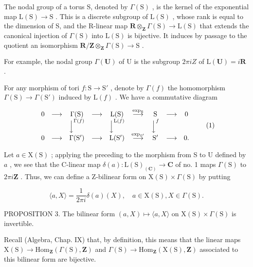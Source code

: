 The nodal group of a torus S, denoted by \(\Gamma(\mathrm{S})\) , is the kernel of the exponential map \(\mathrm{L}(\mathrm{S}) \to \mathrm{S}\) . This is a discrete subgroup of \(\mathrm{L}(\mathrm{S})\) , whose rank is equal to the dimension of S, and the R-linear map \(\mathbf{R} \otimes_{\mathbf{Z}} \Gamma(\mathrm{S}) \to \mathrm{L}(\mathrm{S})\) that extends the canonical injection of \(\Gamma(\mathrm{S})\) into \(\mathrm{L}(\mathrm{S})\) is bijective. It induces by passage to the quotient an isomorphism \(\mathbf{R}/\mathbf{Z} \otimes_{\mathbf{Z}} \Gamma(\mathrm{S}) \to \mathrm{S}\) .

For example, the nodal group \(\Gamma(\mathbf{U})\) of U is the subgroup \(2\pi iZ\) of \(\mathrm{L}(\mathbf{U}) = i\mathbf{R}\) .

For any morphism of tori \(f: \mathrm{S} \to \mathrm{S}'\) , denote by \(\Gamma(f)\) the homomorphism \(\Gamma(\mathrm{S}) \to \Gamma(\mathrm{S}')\) induced by \(\mathrm{L}(f)\) . We have a commutative diagram

\[
\begin{array}{c c c c c c c c c} 0 & \longrightarrow & \Gamma (\mathrm{S}) & \longrightarrow & \mathrm{L} (\mathrm{S}) & \stackrel {{\exp_ {\mathrm{S}}}} {{\longrightarrow}} & \mathrm{S} & \longrightarrow & 0 \\ & & \Big \downarrow^ {\Gamma (f)} & & \Big \downarrow^ {\mathrm{L} (f)} & & \Big \downarrow^ {f} \\ 0 & \longrightarrow & \Gamma (\mathrm{S} ^ {\prime}) & \longrightarrow & \mathrm{L} (\mathrm{S} ^ {\prime}) & \stackrel {{\exp_ {\mathrm{S} ^ {\prime}}}} {{\longrightarrow}} & \mathrm{S} ^ {\prime} & \longrightarrow & 0. \end{array}\tag{1}
\]

Let \(a \in \mathrm{X}(\mathrm{S})\) ; applying the preceding to the morphism from S to U defined by \(a\) , we see that the C-linear map \(\delta(a) : \mathrm{L}(\mathrm{S})_{(\mathbf{C})} \to \mathbf{C}\) of no. 1 maps \(\Gamma(\mathrm{S})\) to \(2\pi i\mathbf{Z}\) . Thus, we can define a Z-bilinear form on \(\mathrm{X}(\mathrm{S}) \times \Gamma(\mathrm{S})\) by putting

\[
\langle a, X \rangle = \frac {1}{2 \pi i} \delta (a) (X), \quad a \in \mathrm{X(S)}, X \in \Gamma (\mathrm{S}).\tag{2}
\]

PROPOSITION 3. The bilinear form \((a,X)\mapsto \langle a,X\rangle\) on \(\mathrm{X(S)}\times \Gamma (\mathrm{S})\) is invertible.

Recall (Algebra, Chap. IX) that, by definition, this means that the linear maps \(\mathrm{X}(\mathrm{S}) \to \mathrm{Hom}_{\mathbf{Z}}(\varGamma(\mathrm{S}), \mathbf{Z})\) and \(\varGamma(\mathrm{S}) \to \mathrm{Hom}_{\mathbf{Z}}(\mathrm{X}(\mathrm{S}), \mathbf{Z})\) associated to this bilinear form are bijective.

